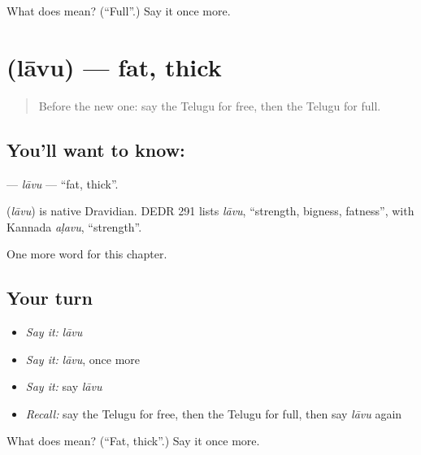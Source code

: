 \begin{tcolorbox}[breakable,colback=teal!4,colframe=teal!35!black,title={Before you move on}]
What does  mean? (\textquotedblleft{}Full\textquotedblright{}.) Say it once more.
\end{tcolorbox}
\section[\texorpdfstring{\te{లావు} (lāvu)}{లావు (lāvu)}]{ (lāvu) — fat, thick}

\label{lesson:TE-C220-lavu}



\begin{quote}
Before the new one: say the Telugu for free, then the Telugu for full.
\end{quote}

\subsection*{You'll want to know: }
\textbf{} — \emph{lāvu} — \textquotedblleft{}fat, thick\textquotedblright{}.

\begin{cousinweb}
\textbf{} (\emph{lāvu}) is native Dravidian. DEDR 291 lists \emph{lāvu}, \textquotedblleft{}strength, bigness, fatness\textquotedblright{}, with Kannada \emph{aḷavu}, \textquotedblleft{}strength\textquotedblright{}.
\end{cousinweb}

\begin{grammarlens}[title={What you've built}]
One more word for this chapter.
\end{grammarlens}

\subsection*{Your turn}
\begin{itemize}
\raggedright
  \item \emph{Say it:} \emph{lāvu}
  \item \emph{Say it:} \emph{lāvu}, once more
  \item \emph{Say it:} say \emph{lāvu}
  \item \emph{Recall:} say the Telugu for free, then the Telugu for full, then say \emph{lāvu} again
\end{itemize}

\begin{tcolorbox}[breakable,colback=teal!4,colframe=teal!35!black,title={Before you move on}]
What does  mean? (\textquotedblleft{}Fat, thick\textquotedblright{}.) Say it once more.
\end{tcolorbox}
